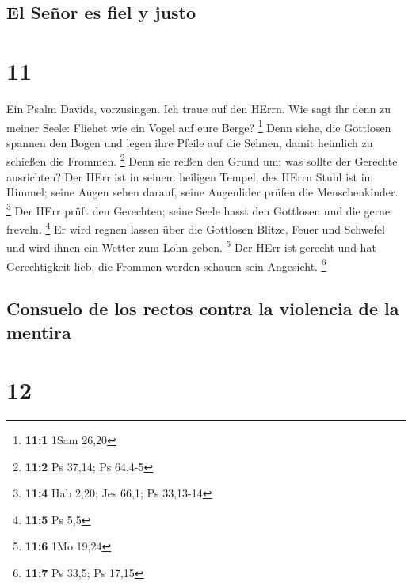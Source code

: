 \hypertarget{el-seuxf1or-es-fiel-y-justo}{%
\subsection{El Señor es fiel y
justo}\label{el-seuxf1or-es-fiel-y-justo}}

\hypertarget{section-10}{%
\section{11}\label{section-10}}

 Ein Psalm Davids, vorzusingen. Ich traue auf den HErrn.
Wie sagt ihr denn zu meiner Seele: Fliehet wie ein Vogel auf eure Berge?
\footnote{\textbf{11:1} 1Sam 26,20}  Denn siehe, die
Gottlosen spannen den Bogen und legen ihre Pfeile auf die Sehnen, damit
heimlich zu schießen die Frommen. \footnote{\textbf{11:2} Ps 37,14; Ps
  64,4-5}  Denn sie reißen den Grund um; was sollte der
Gerechte ausrichten?  Der HErr ist in seinem heiligen
Tempel, des HErrn Stuhl ist im Himmel; seine Augen sehen darauf, seine
Augenlider prüfen die Menschenkinder. \footnote{\textbf{11:4} Hab 2,20;
  Jes 66,1; Ps 33,13-14}  Der HErr prüft den Gerechten;
seine Seele hasst den Gottlosen und die gerne freveln. \footnote{\textbf{11:5}
  Ps 5,5}  Er wird regnen lassen über die Gottlosen
Blitze, Feuer und Schwefel und wird ihnen ein Wetter zum Lohn geben.
\footnote{\textbf{11:6} 1Mo 19,24}  Der HErr ist gerecht
und hat Gerechtigkeit lieb; die Frommen werden schauen sein Angesicht.
\footnote{\textbf{11:7} Ps 33,5; Ps 17,15}

\hypertarget{consuelo-de-los-rectos-contra-la-violencia-de-la-mentira}{%
\subsection{Consuelo de los rectos contra la violencia de la
mentira}\label{consuelo-de-los-rectos-contra-la-violencia-de-la-mentira}}

\hypertarget{section-11}{%
\section{12}\label{section-11}}

